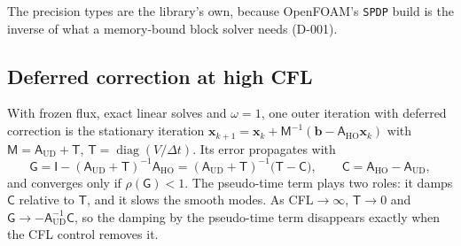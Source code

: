 \documentclass[11pt,a4paper]{article}
\newcommand{\vect}[1]{\mathbf{#1}}
\newcommand{\dt}{\Delta t}
\newcommand{\code}[1]{\texttt{#1}}
\begin{document}
The precision types are the library's own, because OpenFOAM's \code{SPDP}
build is the inverse of what a memory-bound block solver needs (D-001).

\subsection{Deferred correction at high CFL}\label{sec:dcstab}

With frozen flux, exact linear solves and $\omega=1$, one outer iteration
with deferred correction is the stationary iteration
$\vect x_{k+1}=\vect x_k+\mathsf M^{-1}(\vect b-\mathsf A_{\mathrm{HO}}\vect x_k)$ with
$\mathsf M=\mathsf A_{\mathrm{UD}}+\mathsf T$, $\mathsf T=\operatorname{diag}(V/\dt)$.
Its error propagates with
\begin{equation}
  \mathsf G = \mathsf I-(\mathsf A_{\mathrm{UD}}+\mathsf T)^{-1}\mathsf A_{\mathrm{HO}}
  = (\mathsf A_{\mathrm{UD}}+\mathsf T)^{-1}\bigl(\mathsf T-\mathsf C\bigr),
  \qquad \mathsf C=\mathsf A_{\mathrm{HO}}-\mathsf A_{\mathrm{UD}},
  \label{eq:dcG}
\end{equation}
and converges only if $\rho(\mathsf G)<1$. The pseudo-time term plays two
roles: it damps $\mathsf C$ relative to $\mathsf T$, and it slows the
smooth modes. As CFL$\to\infty$, $\mathsf T\to0$ and
$\mathsf G\to-\mathsf A_{\mathrm{UD}}^{-1}\mathsf C$, so the damping by the
pseudo-time term disappears exactly when the CFL control removes it.
\end{document}

